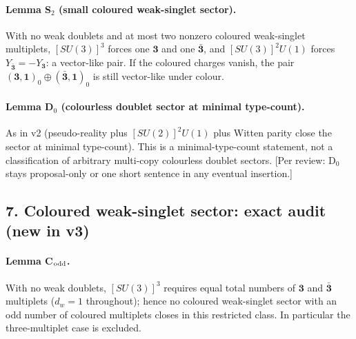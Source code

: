 \paragraph{Lemma S$_2$ (small coloured weak-singlet sector).}
With no weak doublets and at most two nonzero coloured
weak-singlet multiplets, $[SU(3)]^3$ forces one $\mathbf 3$ and
one $\bar{\mathbf 3}$, and $[SU(3)]^2U(1)$ forces
$Y_{\bar{\mathbf 3}}=-Y_{\mathbf 3}$: a vector-like pair.
If the coloured charges vanish, the pair
$(\mathbf 3,\mathbf 1)_0\oplus(\bar{\mathbf 3},\mathbf 1)_0$ is
still vector-like under colour.
\paragraph{Lemma D$_0$ (colourless doublet sector at minimal
type-count).}
As in v2 (pseudo-reality plus $[SU(2)]^2U(1)$ plus Witten parity
close the sector at minimal type-count).
This is a minimal-type-count statement, not a classification of
arbitrary multi-copy colourless doublet sectors.
[Per review: D$_0$ stays proposal-only or one short sentence in
any eventual insertion.]

\subsection*{7. Coloured weak-singlet sector: exact audit
(new in v3)}
\paragraph{Lemma C$_{\rm odd}$.}
With no weak doublets, $[SU(3)]^3$ requires equal total numbers of
$\mathbf 3$ and $\bar{\mathbf 3}$ multiplets ($d_w=1$ throughout);
hence no coloured weak-singlet sector with an odd number of
coloured multiplets closes in this restricted class.
In particular the three-multiplet case is excluded.

